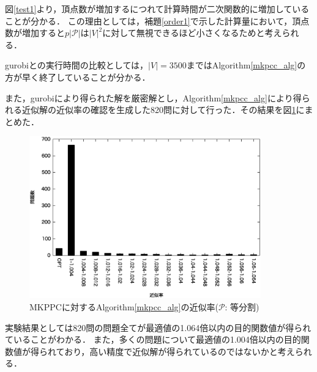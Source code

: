 \documentclass[11pt,dvipdfmx]{jarticle}
\numberwithin{equation}{section}
\begin{document}
            図\ref{test1}より，頂点数が増加するにつれて計算時間が二次関数的に増加していることが分かる．
            この理由としては，補題\ref{order1}で示した計算量において，頂点数が増加すると$p|\mathcal{P}|$は$|V|^2$に対して無視できるほど小さくなるためと考えられる．\par
            gurobiとの実行時間の比較としては，$|V|=3500$まではAlgorithm\ref{mkpcc_alg}の方が早く終了していることが分かる．\par
            また，gurobiにより得られた解を厳密解とし，Algorithm\ref{mkpcc_alg}により得られる近似解の近似率の確認を生成した820問に対して行った．その結果を図\ref{apx1}にまとめた．\par
            \begin{figure}[htbp]
                \begin{center}
                    \includegraphics[width=100mm]{apx1.eps}
                \end{center}
                \caption{MKPPCに対するAlgorithm\ref{mkpcc_alg}の近似率($\mathcal{P}$: 等分割)}
                \label{apx1}
            \end{figure}
            実験結果としては820問の問題全てが最適値の1.064倍以内の目的関数値が得られていることがわかる．
            また，多くの問題について最適値の1.004倍以内の目的関数値が得られており，高い精度で近似解が得られているのではないかと考えられる．
\end{document}
